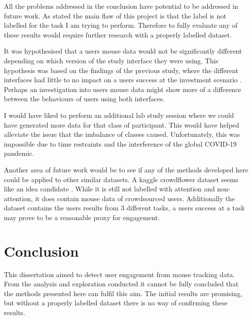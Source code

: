 \documentclass{article}
\begin{document}
All the problems addressed in the conclusion have potential to be addressed in future work.
As stated the main flaw of this project is that the label is not labelled for the task I am trying to perform.
Therefore to fully evaluate any of these results would require further research with a properly labelled dataset.


It was hypothesised that a users mouse data would not be significantly different depending on which version of the study interface they were using.
This hypothesis was based on the findings of the previous study, where the different interfaces had little to no impact on a users success at the investment scenario \cite{gruber2017thesis}.
Perhaps an investigation into users mouse data might show more of a difference between the behaviours of users using both interfaces.

I would have liked to perform an additional lab study session where we could have generated more data for that class of participant.
This would have helped alleviate the issue that the imbalance of classes caused.
Unfortunately, this was impossible due to time restraints and the interference of the global COVID-19 pandemic.

Another area of future work would be to see if any of the methods developed here could be applied to other similar datasets.
A kaggle crowdflower dataset seems like an idea candidate \cite{kaggleWorkerActivity}.
While it is still not labelled with attention and non-attention, it does contain mouse data of crowdsourced users.
Additionally the dataset contains the users results from 3 different tasks, a users success at a task may prove to be a reasonable proxy for engagement. 

\section{Conclusion}

This dissertation aimed to detect user engagement from mouse tracking data.
From the analysis and exploration conducted it cannot be fully concluded that the methods presented here can fulfil this aim.
The initial results are promising, but without a properly labelled dataset there is no way of confirming these results.
\end{document}

